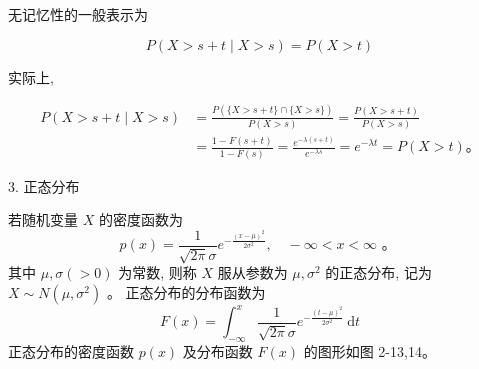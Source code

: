 \documentclass{beamer}
\begin{document}
	\begin{frame}
		无记忆性的一般表示为
		
		$$
		P(X>s+t \mid X>s)=P(X>t)
		$$
		
		实际上,
		
		$$
		\begin{aligned}
			P(X>s+t \mid X>s) & =\frac{P(\{X>s+t\} \cap\{X>s\})}{P(X>s)}=\frac{P(X>s+t)}{P(X>s)} \\
			& =\frac{1-F(s+t)}{1-F(s)}=\frac{e^{-\lambda(s+t)}}{e^{-\lambda s}}=e^{-\lambda t}=P(X>t) 。
		\end{aligned}
		$$
	\end{frame}
	
	\begin{frame}
		3. 正态分布
		
		若随机变量 $X$ 的密度函数为
		$$
		p(x)=\frac{1}{\sqrt{2 \pi} \sigma} e^{-\frac{(x-\mu)^{2}}{2 \sigma^{2}}}, \quad-\infty<x<\infty \text { 。 }
		$$
		其中 $\mu, \sigma(>0)$ 为常数, 则称 $X$ 服从参数为 $\mu, \sigma^{2}$ 的正态分布, 记为 $X \sim N\left(\mu, \sigma^{2}\right)$ 。 正态分布的分布函数为
		$$
		F(x)=\int_{-\infty}^{x} \frac{1}{\sqrt{2 \pi} \sigma} e^{-\frac{(t-\mu)^{2}}{2 \sigma^{2}}} \mathrm{~d} t
		$$
		正态分布的密度函数 $p(x)$ 及分布函数 $F(x)$ 的图形如图 2-13,14。
	\end{frame}
	
	\begin{frame}
		\begin{figure}
			\centering
		\end{figure}
	\end{frame}
	
\end{document}
